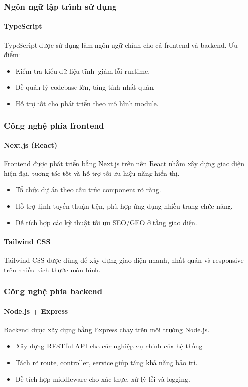 \documentclass[13pt]{article}
\begin{document}
\subsubsection{Ngôn ngữ lập trình sử dụng}
\paragraph{TypeScript}
TypeScript được sử dụng làm ngôn ngữ chính cho cả frontend và backend.
Ưu điểm:
\begin{itemize}
    \item Kiểm tra kiểu dữ liệu tĩnh, giảm lỗi runtime.
    \item Dễ quản lý codebase lớn, tăng tính nhất quán.
    \item Hỗ trợ tốt cho phát triển theo mô hình module.
\end{itemize}

\subsubsection{Công nghệ phía frontend}
\paragraph{Next.js (React)}
Frontend được phát triển bằng Next.js trên nền React nhằm xây dựng giao diện hiện đại,
tương tác tốt và hỗ trợ tối ưu hiệu năng hiển thị.
\begin{itemize}
    \item Tổ chức dự án theo cấu trúc component rõ ràng.
    \item Hỗ trợ định tuyến thuận tiện, phù hợp ứng dụng nhiều trang chức năng.
    \item Dễ tích hợp các kỹ thuật tối ưu SEO/GEO ở tầng giao diện.
\end{itemize}

\paragraph{Tailwind CSS}
Tailwind CSS được dùng để xây dựng giao diện nhanh, nhất quán và responsive trên nhiều kích thước màn hình.

\subsubsection{Công nghệ phía backend}
\paragraph{Node.js + Express}
Backend được xây dựng bằng Express chạy trên môi trường Node.js.
\begin{itemize}
    \item Xây dựng RESTful API cho các nghiệp vụ chính của hệ thống.
    \item Tách rõ route, controller, service giúp tăng khả năng bảo trì.
    \item Dễ tích hợp middleware cho xác thực, xử lý lỗi và logging.
\end{itemize}
\end{document}
